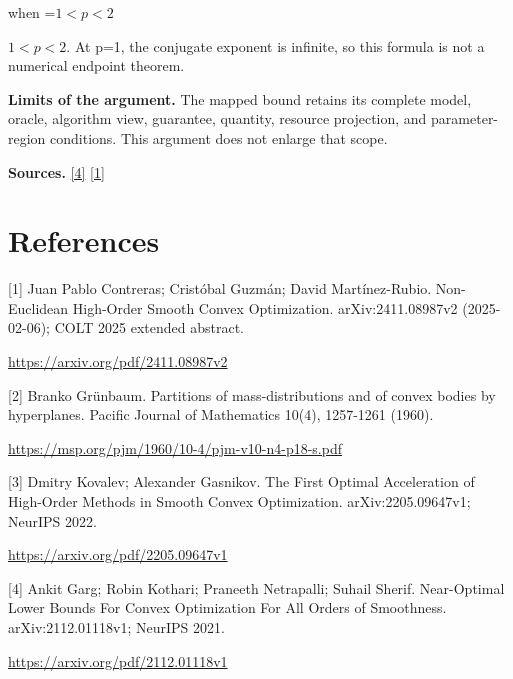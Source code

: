 \documentclass[10pt,a4paper]{article}
\newcommand{\AtlasMath}[1]{\par\begingroup\centering\setbox0=\hbox{$\displaystyle #1$}\ifdim\wd0>1.4\linewidth\typeout{ATLAS WIDE FORMULA: \the\wd0}\fi\ifdim\wd0>\linewidth\resizebox{\linewidth}{!}{\box0}\else\box0\fi\par\endgroup}
\newcommand{\AtlasInlineMath}[1]{\begingroup\setbox0=\hbox{$#1$}\ifdim\wd0>.4\linewidth\endgroup\AtlasMath{#1}\else\endgroup$#1$\fi}
\begin{document}
when \AtlasInlineMath{1<p<2}. At p=1, the conjugate exponent is infinite, so this formula is not a numerical endpoint theorem.

\textbf{Limits of the argument.} The mapped bound retains its complete model, oracle, algorithm view, guarantee, quantity, resource projection, and parameter-region conditions. This argument does not enlarge that scope.

\textbf{Sources.} \href{https://arxiv.org/pdf/2112.01118v1}{[4]} \href{https://arxiv.org/pdf/2411.08987v2}{[1]}

\section{References}
[1] Juan Pablo Contreras; Cristóbal Guzmán; David Martínez-Rubio. Non-Euclidean High-Order Smooth Convex Optimization. arXiv:2411.08987v2 (2025-02-06); COLT 2025 extended abstract.

\url{https://arxiv.org/pdf/2411.08987v2}

[2] Branko Grünbaum. Partitions of mass-distributions and of convex bodies by hyperplanes. Pacific Journal of Mathematics 10(4), 1257-1261 (1960).

\url{https://msp.org/pjm/1960/10-4/pjm-v10-n4-p18-s.pdf}

[3] Dmitry Kovalev; Alexander Gasnikov. The First Optimal Acceleration of High-Order Methods in Smooth Convex Optimization. arXiv:2205.09647v1; NeurIPS 2022.

\url{https://arxiv.org/pdf/2205.09647v1}

[4] Ankit Garg; Robin Kothari; Praneeth Netrapalli; Suhail Sherif. Near-Optimal Lower Bounds For Convex Optimization For All Orders of Smoothness. arXiv:2112.01118v1; NeurIPS 2021.

\url{https://arxiv.org/pdf/2112.01118v1}
\end{document}
